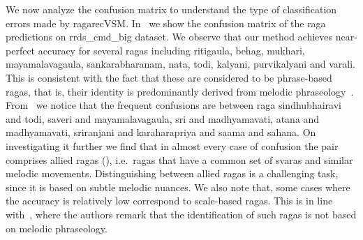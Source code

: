 We now analyze the confusion matrix to understand the type of classification errors made by \acrshort{ragarecVSM}. In~ we show the confusion matrix of the \gls{raga} predictions on \acrshort{rrds_cmd_big} dataset. We observe that our method achieves near-perfect accuracy for several \glspl{raga} including \gls{ritigaula}, \gls{behag}, \gls{mukhari}, \gls{mayamalavagaula}, \gls{sankarabharanam}, \gls{nata}, \gls{todi}, \gls{kalyani}, \gls{purvikalyani} and \gls{varali}. This is consistent with the fact that these are considered to be phrase-based \glspl{raga}, that is, their identity is predominantly derived from melodic phraseology~\citep{krishna2012carnatic}. From~ we notice that the frequent confusions are between \gls{raga} \gls{sindhubhairavi} and \gls{todi}, \gls{saveri} and \gls{mayamalavagaula}, \gls{sri} and \gls{madhyamavati}, \gls{atana} and \gls{madhyamavati}, \gls{sriranjani} and \gls{karaharapriya} and \gls{saama} and \gls{sahana}. On investigating it further we find that in almost every case of confusion the pair comprises allied \glspl{raga} (), i.e.~\glspl{raga} that have a common set of \glspl{svara} and similar melodic movements. Distinguishing between allied \glspl{raga} is a challenging task, since it is based on subtle melodic nuances. We also note that, some cases where the accuracy is relatively low correspond to scale-based \glspl{raga}. This is in line with~\cite{krishna2012carnatic}, where the authors remark that the identification of such \glspl{raga} is not based on melodic phraseology. 

